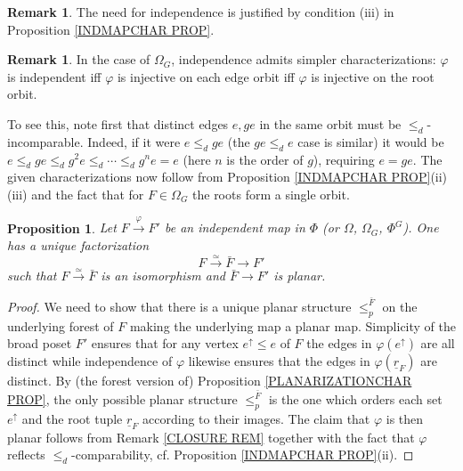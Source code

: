 \documentclass[a4paper,10pt
,draft
]{article}%
\numberwithin{equation}{section}
\numberwithin{figure}{section}
\newtheorem{proposition}[equation]{Proposition}%
\theoremstyle{definition} %
\newtheorem{remark}[equation]{Remark}%
\newcommand{\1}{\ensuremath{\mathbbm 1}}%
\begin{document}
\begin{remark}
The need for independence is justified by
condition (iii) in Proposition \ref{INDMAPCHAR PROP}.
\end{remark}


\begin{remark}\label{INDOMGALT REM}
In the case of $\Omega_G$,
independence admits simpler characterizations:
$\varphi$ is independent iff $\varphi$ is injective on each edge orbit iff $\varphi$ is injective on the root orbit.

To see this, note first that distinct edges $e, g e$ in the same orbit must be $\leq_d$-incomparable.
Indeed, if it were 
$e \leq_d g e$ (the $g e \leq_d e$ case is similar)
it would be
$e \leq_d g e \leq_d g^2 e \leq_d \cdots
\leq_d g^n e = e$ (here $n$ is the order of $g$),
requiring $e=ge$.
The given characterizations now follow from
Proposition \ref{INDMAPCHAR PROP}(ii)(iii)
and the fact that for $F \in \Omega_G$ the roots form a single orbit.
\end{remark}


\begin{proposition}
\label{PLANARPULL PROP}
	Let $F \xrightarrow{\varphi} F'$ be an independent map in $\Phi$ (or $\Omega$, $\Omega_G$, $\Phi^G$). 
	One has a unique factorization 
	\[F \xrightarrow{\simeq} \bar{F} \to F'\]
	such that $F \xrightarrow{\simeq} \bar{F}$ is an isomorphism and $\bar{F} \to F'$ is planar.
\end{proposition}

\begin{proof}
We need to show that there is a unique planar structure 
$\leq_p^{\bar{F}}$ on the underlying forest of $F$ making the underlying map a planar map.
Simplicity \cite[Def. 5.3]{Pe17}
of the broad poset $F'$ ensures that for any vertex $e^{\uparrow} \leq e$ of $F$ the edges in $\varphi(e^{\uparrow})$ are all distinct while independence of $\varphi$ likewise ensures that the edges in $\varphi(\underline{r}_F)$ are distinct.
By (the forest version of) Proposition
\ref{PLANARIZATIONCHAR PROP},
the only possible planar structure $\leq_p^{\bar{F}}$
is the one which orders each set $e^{\uparrow}$ and the root tuple $\underline{r}_F$ according to their images.
The claim that $\varphi$ is then planar follows from 
Remark \ref{CLOSURE REM}
together with the
fact that $\varphi$ reflects $\leq_d$-comparability,
cf. Proposition \ref{INDMAPCHAR PROP}(ii).
\end{proof}
\end{document}
